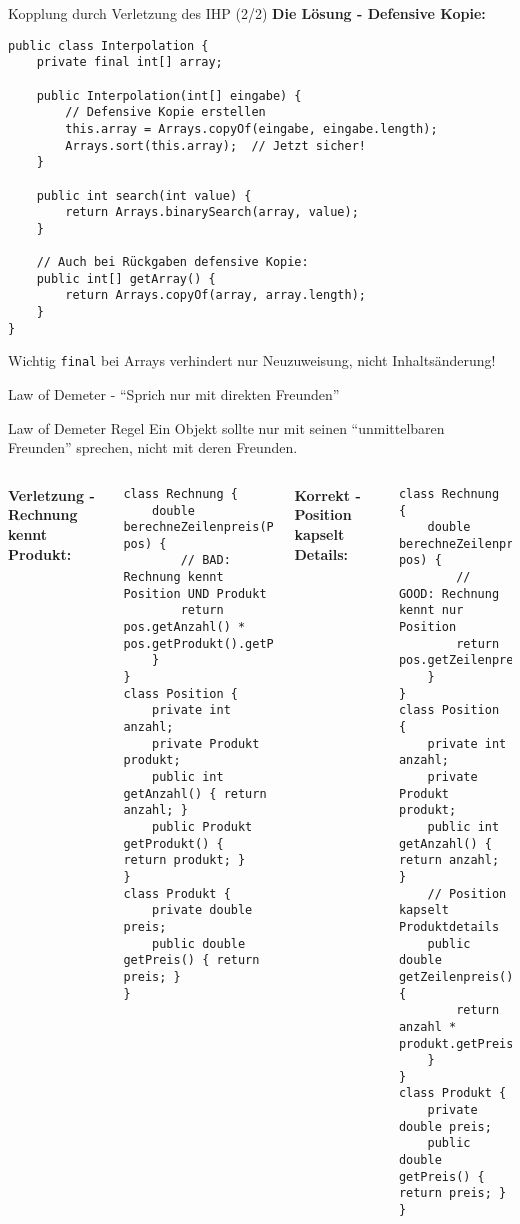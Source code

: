 \begin{frame}[fragile]{Kopplung durch Verletzung des IHP (2/2)}
  \textbf{Die Lösung - Defensive Kopie:}
  \begin{lstlisting}[style=java, basicstyle=\tiny\ttfamily]
public class Interpolation {
    private final int[] array;

    public Interpolation(int[] eingabe) {
        // Defensive Kopie erstellen
        this.array = Arrays.copyOf(eingabe, eingabe.length);
        Arrays.sort(this.array);  // Jetzt sicher!
    }

    public int search(int value) {
        return Arrays.binarySearch(array, value);
    }

    // Auch bei Rückgaben defensive Kopie:
    public int[] getArray() {
        return Arrays.copyOf(array, array.length);
    }
}
  \end{lstlisting}
  \begin{alertblock}{Wichtig}
    \texttt{final} bei Arrays verhindert nur Neuzuweisung, nicht Inhaltsänderung!
  \end{alertblock}
\end{frame}

\begin{frame}[fragile]{Law of Demeter - ``Sprich nur mit direkten Freunden''}
  \begin{exampleblock}{Law of Demeter Regel}
    Ein Objekt sollte nur mit seinen ``unmittelbaren Freunden'' sprechen, nicht mit deren Freunden.
  \end{exampleblock}
  \begin{columns}[T]
    \textbf{Verletzung - Rechnung kennt Produkt:}
    \begin{lstlisting}[style=java, basicstyle=\tiny\ttfamily]
class Rechnung {
    double berechneZeilenpreis(Position pos) {
        // BAD: Rechnung kennt Position UND Produkt
        return pos.getAnzahl() * pos.getProdukt().getPreis();
    }
}
class Position {
    private int anzahl;
    private Produkt produkt;
    public int getAnzahl() { return anzahl; }
    public Produkt getProdukt() { return produkt; }
}
class Produkt {
    private double preis;
    public double getPreis() { return preis; }
}
    \end{lstlisting}
    \textbf{Korrekt - Position kapselt Details:}
    \begin{lstlisting}[style=java, basicstyle=\tiny\ttfamily]
class Rechnung {
    double berechneZeilenpreis(Position pos) {
        // GOOD: Rechnung kennt nur Position
        return pos.getZeilenpreis();
    }
}
class Position {
    private int anzahl;
    private Produkt produkt;
    public int getAnzahl() { return anzahl; }
    // Position kapselt Produktdetails
    public double getZeilenpreis() {
        return anzahl * produkt.getPreis();
    }
}
class Produkt {
    private double preis;
    public double getPreis() { return preis; }
}
    \end{lstlisting}
  \end{columns}
\end{frame}

